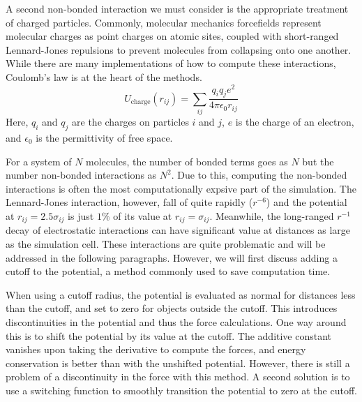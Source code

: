 A second non-bonded interaction we must consider is the appropriate
treatment of charged particles. Commonly, molecular mechanics
forcefields represent molecular charges as point charges on atomic
sites, coupled with short-ranged Lennard-Jones repulsions to prevent
molecules from collapsing onto one another. While there are many
implementations of how to compute these interactions, Coulomb's law is
at the heart of the methods.
\begin{equation}\label{eq:coulomb}
U_{\mathrm{charge}}(r_{ij}) = \sum_{ij}\frac{q_i q_j e^2}{4 \pi \epsilon_0
  r_{ij}}
\end{equation}
Here, $q_i$ and $q_j$ are the charges on particles $i$ and $j$, $e$ is
the charge of an electron, and $\epsilon_0$ is the permittivity of
free space. 

For a system of $N$ molecules, the number of bonded terms goes as $N$
but the number non-bonded interactions as $N^2$. Due to this,
computing the non-bonded interactions is often the most
computationally expsive part of the simulation. The Lennard-Jones
interaction, however, fall of quite rapidly ($r^{-6}$) and the
potential at $r_{ij} = 2.5\sigma_{ij}$ is just $1 \%$ of its value at
$r_{ij} = \sigma_{ij}$. Meanwhile, the long-ranged $r^{-1}$ decay of
electrostatic interactions can have significant value at distances as
large as the simulation cell. These interactions are quite problematic
and will be addressed in the following paragraphs. However, we will
first discuss adding a cutoff to the potential, a method commonly
used to save computation time.


When using a cutoff radius, the potential is evaluated as normal for
distances less than the cutoff, and set to zero for objects outside
the cutoff. This introduces discontinuities in the potential and thus
the force calculations. One way around this is to shift the potential
by its value at the cutoff.  The additive constant vanishes upon
taking the derivative to compute the forces, and energy conservation
is better than with the unshifted potential. However, there is still a
problem of a discontinuity in the force with this method. A second
solution is to use a switching function to smoothly transition the
potential to zero at the cutoff.

